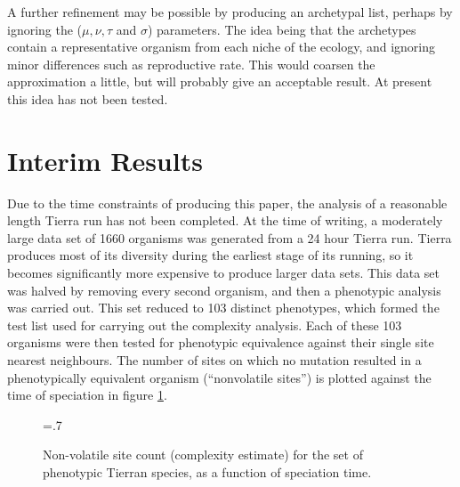 A further refinement may be possible by producing an archetypal list,
perhaps by ignoring the ($\mu,\nu,\tau$ and $\sigma$) parameters. The
idea being that the archetypes contain a representative organism from
each niche of the ecology, and ignoring minor differences such as
reproductive rate. This would coarsen the approximation a little, but
will probably give an acceptable result. At present this idea has not
been tested.

\section{Interim Results}

Due to the time constraints of producing this paper, the analysis of a
reasonable length Tierra run has not been completed.  At the time of
writing, a moderately large data set of 1660 organisms was generated
from a 24 hour Tierra run. Tierra produces most of its diversity
during the earliest stage of its running, so it becomes significantly
more expensive to produce larger data sets. This data set was halved
by removing every second organism, and then a phenotypic analysis was
carried out. This set reduced to 103 distinct phenotypes, which formed
the test list used for carrying out the complexity analysis. Each of
these 103 organisms were then tested for phenotypic equivalence
against their single site nearest neighbours. The number of sites on
which no mutation resulted in a phenotypically equivalent organism
(``nonvolatile sites'') is plotted against the time of speciation
in figure \ref{results}.

\begin{figure}
\begin{center}
\mbox{}\epsfxsize=.7\textwidth{}
\end{center}
\caption{Non-volatile site count (complexity estimate) for the set of
  phenotypic Tierran species, as a function of speciation time.}
\label{results}
\end{figure}


